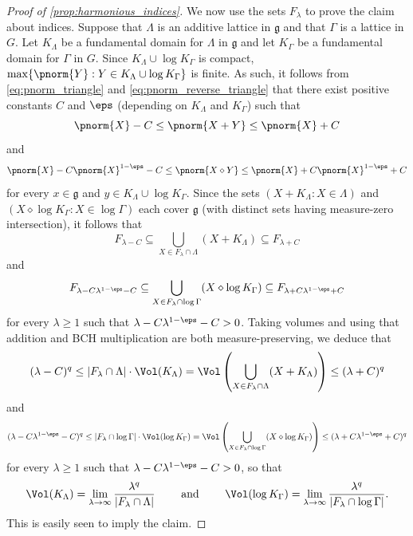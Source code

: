 \begin{proof}[Proof of \cref{prop:harmonious_indices}]
We now use the sets $F_\lambda$ to prove the claim about indices. Suppose that $\Lambda$ is an additive lattice in $\mathfrak{g}$ and that $\Gamma$ is a lattice in $G$. Let $K_\Lambda$ be a fundamental domain for $\Lambda$ in $\mathfrak{g}$ and let $K_\Gamma$ be a fundamental domain for $\Gamma$ in $G$. 
%
 Since $K_\Lambda \cup \log K_\Gamma$ is compact, $\max\{\pnorm{Y}:Y\in K_\Lambda \cup \log K_\Gamma\}$ is finite. As such, it follows from \eqref{eq:pnorm_triangle} and \eqref{eq:pnorm_reverse_triangle} that there exist positive constants $C$ and $\eps$ (depending on $K_\Lambda$ and $K_\Gamma$) such that
\[
\pnorm{X}-C \leq \pnorm{X+Y} \leq \pnorm{X} + C
 \]
 and
 \[
 \pnorm{X}-C\pnorm{X}^
{1-\eps} -C \leq \pnorm{X 
\diamond Y} \leq \pnorm{X} + C \pnorm{X}^
{1-\eps}+C
\]
for every $x\in \mathfrak{g}$ and $y\in K_\Lambda \cup \log K_\Gamma$. %
Since the sets $(X+K_\Lambda : X \in \Lambda)$ and $(X \diamond \log K_\Gamma : X \in \log \Gamma)$ each cover $\mathfrak{g}$ (with distinct sets having measure-zero intersection), it follows that 
\[
 F_{\lambda - C} \subseteq \bigcup_{X \in F_\lambda \cap \Lambda} (X+K_\Lambda) \subseteq F_{\lambda + C}
%
\]
and
\[
 F_{\lambda-C\lambda^{1-\eps}-C} \subseteq \bigcup_{X \in F_\lambda \cap \log \Gamma} (X \diamond \log K_\Gamma) \subseteq F_{\lambda + C\lambda^{1-\eps}+C}
\]
for every $\lambda \geq 1$ such that $\lambda-C\lambda^{1-\eps}-C>0$. Taking volumes and using that addition and BCH multiplication are both measure-preserving, we deduce that
\begin{equation*}
(\lambda-C)^q \leq |F_\lambda \cap \Lambda| \cdot \Vol (K_\Lambda) = \Vol \left(\bigcup_{X\in F_\lambda \cap \Lambda} (X+K_\Lambda) \right) \leq (\lambda+C)^q
\label{eq:Folner_Lambda_final}
\end{equation*}
and
\begin{equation*}
%
(\lambda - C\lambda^{1-\eps}-C)^q
 \leq |F_\lambda \cap \log \Gamma| \cdot \Vol (\log K_\Gamma) = \Vol \left(\bigcup_{X\in F_\lambda \cap \log \Gamma} (X \diamond \log K_\Gamma) \right)  \leq (\lambda + C\lambda^{1-\eps}+C)^q
\label{eq:Folner_Gamma_final}
\end{equation*}
for every $\lambda \geq 1$ such that $\lambda-C\lambda^{1-\eps}-C>0$, so that
\begin{equation}
\Vol (K_\Lambda) = \lim_{\lambda \to \infty} \frac{\lambda^q}{|F_\lambda \cap \Lambda|} \qquad \text{ and } \qquad \Vol (\log K_\Gamma) = \lim_{\lambda \to \infty} \frac{\lambda^q}{|F_\lambda \cap \log \Gamma|}.
\end{equation}
This is easily seen to imply the claim.
\end{proof}


